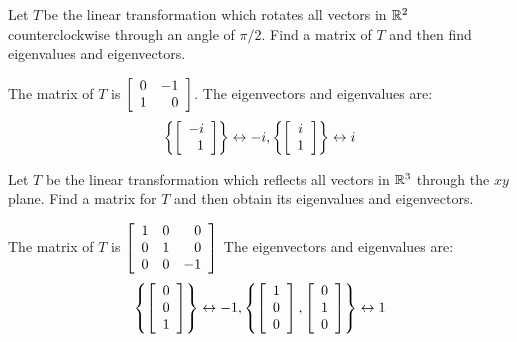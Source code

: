 \begin{enumialphparenastyle}
\begin{ex} Let $T\,$be the linear transformation which rotates all vectors in 
$\mathbb{R}^{2}$ counterclockwise through an angle of $\pi /2.$ Find a matrix
of $T$ and then find eigenvalues and eigenvectors.
\begin{sol}
The matrix of $T$ is $\left[
\begin{array}{rr}
0 & -1 \\
1 & 0
\end{array}
\right]$. The eigenvectors and eigenvalues are:
\[
\left\{ \left[
\begin{array}{r}
-i \\
1
\end{array}
\right] \right\} \leftrightarrow -i,\left\{ \left[
\begin{array}{c}
i \\
1
\end{array}
\right] \right\} \leftrightarrow i
\]
\end{sol}
\end{ex}

\begin{ex} Let $T$ be the linear transformation which reflects all vectors in $
\mathbb{R}^{3}$ through the $xy$ plane. Find a matrix for $T$ and then
obtain its eigenvalues and eigenvectors. 
\begin{sol}
The matrix of $T$ is $\left[
\begin{array}{rrr}
1 & 0 & 0 \\
0 & 1 & 0 \\
0 & 0 & -1
\end{array}
\right]$
The eigenvectors and eigenvalues are:
\[
\left\{ \left[
\begin{array}{c}
0 \\
0 \\
1
\end{array}
\right] \right\} \leftrightarrow -1,\left\{ \left[
\begin{array}{c}
1 \\
0 \\
0
\end{array}
\right] ,\left[
\begin{array}{c}
0 \\
1 \\
0
\end{array}
\right] \right\} \leftrightarrow 1
\]
\end{sol}
\end{ex}

\end{enumialphparenastyle}